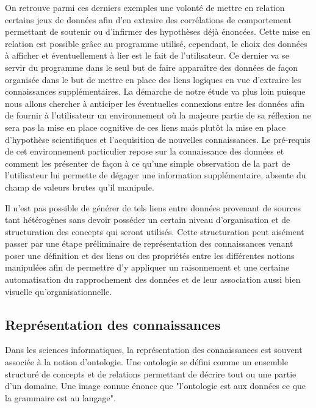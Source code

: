 On retrouve parmi ces derniers exemples une volonté de mettre en relation certains jeux de données afin d'en extraire des corrélations de comportement permettant de soutenir ou d'infirmer des hypothèses déjà énoncées. Cette mise en relation est possible grâce au programme utilisé, cependant, le choix des données à afficher et éventuellement à lier est le fait de l'utilisateur. Ce dernier va se servir du programme dans le seul but de faire apparaître des données de façon organisée dans le but de mettre en place des liens logiques en vue d'extraire les connaissances supplémentaires. La démarche de notre étude va plus loin puisque nous allons chercher à anticiper les éventuelles connexions entre les données afin de fournir à l'utilisateur un environnement où la majeure partie de sa réflexion ne sera pas la mise en place cognitive de ces liens mais plutôt la mise en place d'hypothèse scientifiques et l'acquisition de nouvelles connaissances. Le pré-requis de cet environnement particulier repose sur la connaissance des données et comment les présenter de façon à ce qu'une simple observation de la part de l'utilisateur lui permette de dégager une information supplémentaire, absente du champ de valeurs brutes qu'il manipule.

Il n'est pas possible de générer de tels liens entre données provenant de sources tant hétérogènes sans devoir posséder un certain niveau d'organisation et de structuration des concepts qui seront utilisés. Cette structuration peut aisément passer par une étape préliminaire de représentation des connaissances venant poser une définition et des liens ou des propriétés entre les différentes notions manipulées afin de permettre d'y appliquer un raisonnement et une certaine automatisation du rapprochement des données et de leur association aussi bien visuelle qu'organisationnelle.


\subsection{Représentation des connaissances}

Dans les sciences informatiques, la représentation des connaissances est souvent associée à la notion d'ontologie. Une ontologie se défini comme un ensemble structuré de concepts et de relations permettant de décrire tout ou une partie d'un domaine. Une image connue énonce que "l'ontologie est aux données ce que la grammaire est au langage".

